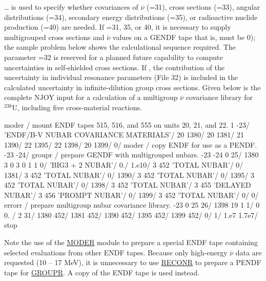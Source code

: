  \ldots\hspace{.1in} is used to specify whether
covariances of $\overline{\nu}$ (=31), cross
sections (=33), angular distributions (=34),
secondary energy distributions (=35), or radioactive nuclide
production (=40) are needed.  If =31, 35, or 40,
it is necessary to supply multigrouped
cross sections and $\overline{\nu}$ values on a GENDF tape
that is,  must be 0); the sample problem below shows
the calculational sequence required.  The parameter =32
is reserved for a planned future capability to compute
uncertainties in self-shielded cross sections.  If ,
the contribution of the uncertainty in individual resonance parameters
(File 32) is included in the calculated uncertainty in
infinite-dilution group cross sections.  Given below is the complete
NJOY input for a calculation of a multigroup $\overline{\nu}$
covariance library for $^{238}$U, including five cross-material
reactions.

\small
\begin{ccode}

   moder / mount ENDF tapes 515, 516, and 555 on units 20, 21, and 22.
   1 -23/
   'ENDF/B-V NUBAR COVARIANCE MATERIALS'/
   20 1380/
   20 1381/
   21 1390/
   22 1395/
   22 1398/
   20 1399/
   0/
   moder / copy ENDF for use as a PENDF.
   -23 -24/
   groupr / prepare GENDF with multigrouped nubars.
   -23 -24 0 25/
   1380 3 0 3 0 1 1 0/
   'BIG3 + 2 NUBAR'/
   0./
   1.e10/
   3 452 'TOTAL NUBAR'/
   0/
   1381/
   3 452 'TOTAL NUBAR'/
   0/
   1390/
   3 452 'TOTAL NUBAR'/
   0/
   1395/
   3 452 'TOTAL NUBAR'/
   0/
   1398/
   3 452 'TOTAL NUBAR'/
   3 455 'DELAYED NUBAR'/
   3 456 'PROMPT NUBAR'/
   0/
   1399/
   3 452 'TOTAL NUBAR'/
   0/
   0/
   errorr / prepare multigroup nubar covariance library.
   -23 0 25 26/
   1398 19 1 1/
   0 0. /
   2 31/
   1380 452/
   1381 452/
   1390 452/
   1395 452/
   1399 452/
   0/
   1/
   1.e7 1.7e7/
   stop

\end{ccode}
\normalsize

Note the use of the \hyperlink{sMODERhy}{MODER} module
to prepare a special ENDF tape
containing selected evaluations from other ENDF tapes.  Because only
high-energy $\overline{\nu}$ data are requested (10 -- 17 MeV), it is
unnecessary to use \hyperlink{sRECONRhy}{RECONR} to prepare
a PENDF tape for \hyperlink{sGROUPRhy}{GROUPR}.  A copy
of the ENDF tape is used instead.

